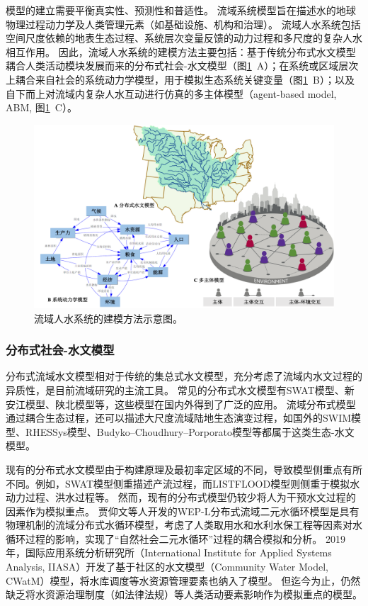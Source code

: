 
模型的建立需要平衡真实性、预测性和普适性\cite{gunderson2017}。
流域系统模型旨在描述水的地球物理过程动力学及人类管理元素（如基础设施、机构和治理）\cite{hadjimichael2020}。
流域人水系统包括空间尺度依赖的地表生态过程、系统层次变量反馈的动力过程和多尺度的复杂人水相互作用\cite{bodin2017b,sayles2017,sayles2019}。
因此，流域人水系统的建模方法主要包括：基于传统分布式水文模型耦合人类活动模块发展而来的分布式社会-水文模型（图\ref{ch1:fig:models}~A）；在系统或区域层次上耦合来自社会的系统动力学模型，用于模拟生态系统关键变量（图\ref{ch1:fig:models}~B）；以及自下而上对流域内复杂人水互动进行仿真的多主体模型（agent-based model, ABM, 图\ref{ch1:fig:models}~C）。

\begin{figure}[!ht]
    \centering
    \includegraphics[width=\textwidth]{img/ch1/ch1_models.png}
    \caption[流域人水系统的建模方法示意图]{流域人水系统的建模方法示意图。}\label{ch1:fig:models}
\end{figure}

\subsubsection{分布式社会-水文模型}

分布式流域水文模型相对于传统的集总式水文模型，充分考虑了流域内水文过程的异质性\cite{wangzhonggen2003}，是目前流域研究的主流工具。
常见的分布式水文模型有SWAT模型、新安江模型、陕北模型等，这些模型在国内外得到了广泛的应用\cite{arnold1998,xiajun2003,ficklin2009}。
流域分布式模型通过耦合生态过程，还可以描述大尺度流域陆地生态演变过程，如国外的SWIM模型\cite{krysanova2005}、RHESSys模型\cite{tague2004}、Budyko–Choudhury–Porporato模型\cite{donohue2012}等都属于这类生态-水文模型。

现有的分布式水文模型由于构建原理及最初率定区域的不同，导致模型侧重点有所不同。例如，SWAT模型侧重描述产流过程\cite{wangzhonggen2003a}，而LISTFLOOD模型则侧重于模拟水动力过程、洪水过程等\cite{zengzhaoyang2017}。
然而，现有的分布式模型仍较少将人为干预水文过程的因素作为模拟重点。
贾仰文等人开发的WEP-L分布式流域二元水循环模型是具有物理机制的流域分布式水循环模型，考虑了人类取用水和水利水保工程等因素对水循环过程的影响，实现了“自然\textendash{}社会二元水循环”过程的耦合模拟和分析\cite{jia2010}。
2019年，国际应用系统分析研究所（International Institute for Applied Systems Analysis, IIASA）开发了基于社区的水文模型（Community Water Model, CWatM）模型，将水库调度等水资源管理要素也纳入了模型\cite{burek2020}。
但迄今为止，仍然缺乏将水资源治理制度（如法律法规）等人类活动要素影响作为模拟重点的模型。

